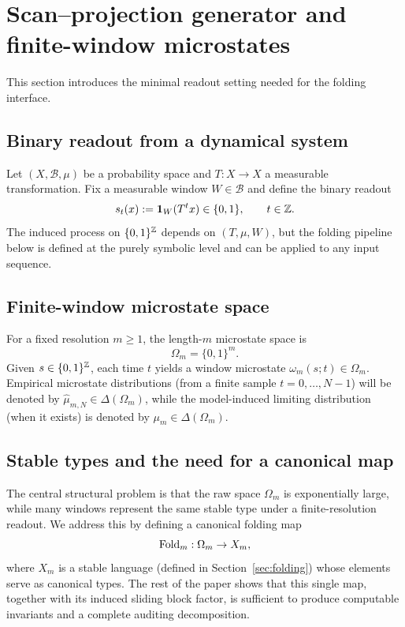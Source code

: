 \section{Scan--projection generator and finite-window microstates}\label{sec:generator}

This section introduces the minimal readout setting needed for the folding interface.

\subsection{Binary readout from a dynamical system}\label{subsec:generator-readout}
Let $(X,\mathcal{B},\mu)$ be a probability space and $T:X\to X$ a measurable transformation.
Fix a measurable window $W\in\mathcal{B}$ and define the binary readout
\[
s_t(x):=\mathbf{1}_W(T^t x)\in\{0,1\},\qquad t\in\mathbb{Z}.
\]
The induced process on $\{0,1\}^{\mathbb{Z}}$ depends on $(T,\mu,W)$, but the folding pipeline below is defined at the purely symbolic level and can be applied to any input sequence.

\subsection{Finite-window microstate space}\label{subsec:generator-omega}
For a fixed resolution $m\ge 1$, the length-$m$ microstate space is
\[
\Omega_m=\{0,1\}^m.
\]
Given $s\in\{0,1\}^{\mathbb{Z}}$, each time $t$ yields a window microstate $\omega_m(s;t)\in\Omega_m$.
Empirical microstate distributions (from a finite sample $t=0,\dots,N-1$) will be denoted by $\hat{\mu}_{m,N}\in\Delta(\Omega_m)$, while the model-induced limiting distribution (when it exists) is denoted by $\mu_m\in\Delta(\Omega_m)$.

\subsection{Stable types and the need for a canonical map}\label{subsec:generator-stable-types}
The central structural problem is that the raw space $\Omega_m$ is exponentially large, while many windows represent the same stable type under a finite-resolution readout.
We address this by defining a canonical folding map
\[
\mathrm{Fold}_m:\Omega_m\to X_m,
\]
where $X_m$ is a stable language (defined in Section~\ref{sec:folding}) whose elements serve as canonical types.
The rest of the paper shows that this single map, together with its induced sliding block factor, is sufficient to produce computable invariants and a complete auditing decomposition.

